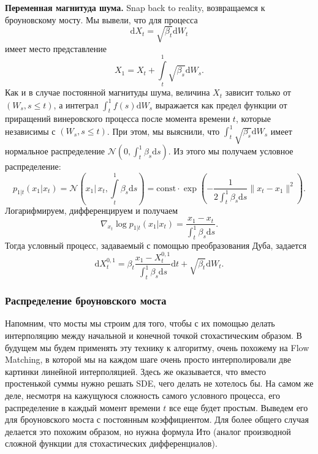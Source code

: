 \documentclass[12pt]{article}
\theoremstyle{definition}
\begin{document}
\noindent\textbf{Переменная магнитуда шума.} Snap back to reality, возвращаемся к броуновскому мосту. Мы вывели, что для процесса
\[
    \mathrm{d} X_t = \sqrt{\beta_t} \mathrm{d} W_t
\]
имеет место представление
\[
    X_1 = X_t + \int\limits_{t}^{1} \sqrt{\beta_s} \mathrm{d} W_s.
\]
Как и в случае постоянной магнитуды шума, величина $X_t$ зависит только от $(W_s, s \leq t)$, а интеграл $\int_{t}^{1} f(s) \mathrm{d}W_s$ выражается как предел функции от приращений винеровского процесса после момента времени $t$, которые независимы с $(W_s, s \leq t)$. При этом, мы выяснили, что $\int_{t}^1\sqrt{\beta_s}\mathrm{d}W_s$ имеет нормальное распределение $\mathcal{N}(0, \int_{t}^{1} \beta_s \mathrm{d} s)$. Из этого мы получаем условное распределение:
\[
    p_{1 | t}(x_1 | x_t) = \mathcal{N}\left(x_1 \Bigg|\, x_t, \int\limits_{t}^{1} \beta_s \mathrm{d} s\right) = \text{const} \cdot \exp \left(-\frac{1}{2 \int_{t}^1 \beta_s \mathrm{d}s} \|x_t - x_1\|^2 \right).
\]
Логарифмируем, дифференцируем и получаем
\[
    \nabla_{x_t} \log p_{1 | t}(x_1 | x_t) = \frac{x_1 - x_t}{\int_{t}^{1}\beta_s \mathrm{d}s}.
\]
Тогда условный процесс, задаваемый с помощью преобразования Дуба, задается
\[
    \mathrm{d} X_t^{0, 1} = \beta_t \frac{x_1 - X_t^{0, 1}}{\int_{t}^{1}\beta_s \mathrm{d} s} \mathrm{d} t + \sqrt{\beta_t}\mathrm{d} W_t.
\]

\subsubsection{Распределение броуновского моста}
Напомним, что мосты мы строим для того, чтобы с их помощью делать интерполяцию между начальной и конечной точкой стохастическим образом. В будущем мы будем применять эту технику к алгоритму, очень похожему на Flow Matching, в которой мы на каждом шаге очень просто интерполировали две картинки линейной интерполяцией. Здесь же оказывается, что вместо простенькой суммы нужно решать SDE, чего делать не хотелось бы. На самом же деле, несмотря на кажущуюся сложность самого условного процесса, его распределение в каждый момент времени $t$ все еще будет простым. Выведем его для броуновского моста с постоянным коэффициентом. Для более общего случая делается это похожим образом, но нужна формула Ито (аналог производной сложной функции для стохастических дифференциалов).
\end{document}
